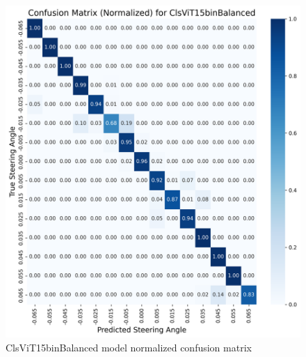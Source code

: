 \begin{figure}[H]
\centering
\includegraphics[width=1\linewidth]{Figures/Results/cm_norm_ClsViT15binBalanced.png}
\caption{ClsViT15binBalanced model normalized confusion matrix}
\label{fig:cm_norm_ClsViT15binBalanced}
\end{figure}


